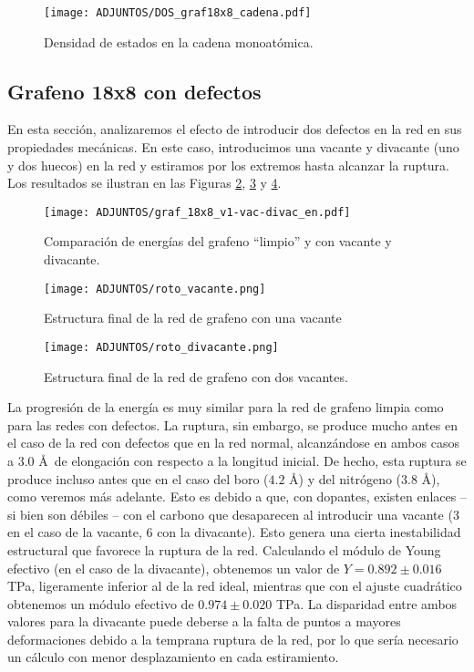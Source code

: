 \begin{figure}[!h]
    \centering
    \texttt{[image: ADJUNTOS/DOS\_graf18x8\_cadena.pdf]}
    \caption{Densidad de estados en la cadena monoatómica.}
    \label{fig:4.17}
\end{figure}

\subsection{Grafeno 18x8 con defectos}
En esta sección, analizaremos el efecto de introducir dos defectos en la red en sus propiedades mecánicas. En este caso, introducimos una vacante y divacante (uno y dos huecos) en la red y estiramos por los extremos hasta alcanzar la ruptura. Los resultados se ilustran en las Figuras \ref{fig:4.11}, \ref{fig:4.14} y \ref{fig:4.15}. \\

\begin{figure}[!h]
     \centering
     \texttt{[image: ADJUNTOS/graf\_18x8\_v1-vac-divac\_en.pdf]}
     \caption{Comparación de energías del grafeno ``limpio'' y con vacante y divacante.}
     \label{fig:4.11}
 \end{figure}

\begin{figure}[!h]
    \centering
    \texttt{[image: ADJUNTOS/roto\_vacante.png]}
    \caption{Estructura final de la red de grafeno con una vacante}
    \label{fig:4.14}
\end{figure}

\begin{figure}[!h]
    \centering
    \texttt{[image: ADJUNTOS/roto\_divacante.png]}
    \caption{Estructura final de la red de grafeno con dos vacantes. }
    \label{fig:4.15}
\end{figure}

La progresión de la energía es muy similar para la red de grafeno limpia como para las redes con defectos. La ruptura, sin embargo, se produce mucho antes en el caso de la red con defectos que en la red normal, alcanzándose en ambos casos a $3.0$ \AA \ de elongación con respecto a la longitud inicial. De hecho, esta ruptura se produce incluso antes que en el caso del boro ($4.2$ \AA) y del nitrógeno ($3.8$ \AA), como veremos más adelante. Esto es debido a que, con dopantes, existen enlaces -- si bien son débiles -- con el carbono que desaparecen al introducir una vacante (3 en el caso de la vacante, 6 con la divacante). Esto genera una cierta inestabilidad estructural que favorece la ruptura de la red. Calculando el módulo de Young efectivo (en el caso de la divacante), obtenemos un valor de $Y = 0.892 \pm 0.016 $ TPa, ligeramente inferior al de la red ideal, mientras que con el ajuste cuadrático obtenemos un módulo efectivo de $0.974 \pm 0.020$ TPa. La disparidad entre ambos valores para la divacante puede deberse a la falta de puntos a mayores deformaciones debido a la temprana ruptura de la red, por lo que sería necesario un cálculo con menor desplazamiento en cada estiramiento.


